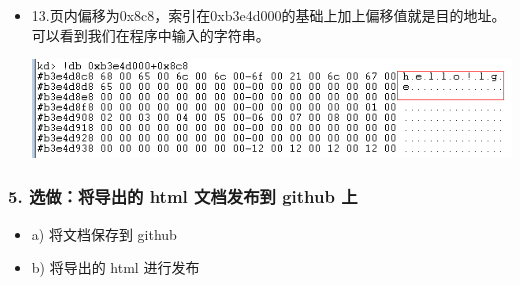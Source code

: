 \documentclass[UTF8]{ctexart}
\begin{document}
\begin{itemize}
\begin{itemize}
\begin{center}
\end{center}
\item 13.页内偏移为0x8c8，索引在0xb3e4d000的基础上加上偏移值就是目的地址。可以看到我们在程序中输入的字符串。
\begin{center}
\includegraphics[width=.9\linewidth]{image/27.png}
\end{center}
\end{itemize}
\end{itemize}
\subsubsection*{5. 选做：将导出的 html 文档发布到 github 上}
\label{sec:org5a692e3}
\begin{itemize}
\item a) 将文档保存到 github
\label{sec:org303a2a2}
\item b) 将导出的 html 进行发布
\label{sec:orgbc3904d}
\end{itemize}
\end{document}
